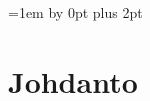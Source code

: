 \documentclass[12pt,a4paper]{article}
\begin{document}
%
%
%
%
%

\newpage
\thispagestyle{empty}
\tableofcontents
\newpage
\setcounter{page}{1}
\parskip=1em \advance\parskip by 0pt plus 2pt
\pagestyle{fancy}


\section{Johdanto}



\cite{rj, yt, enzo}

%
\end{document}
